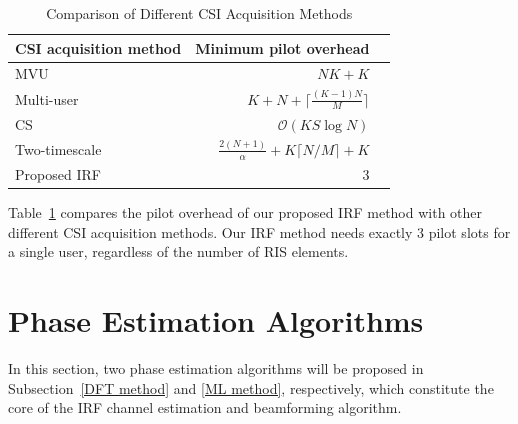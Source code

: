 \documentclass[conference,10pt,twocolumn]{IEEEtran}
\theoremstyle{nonumberplain}
\begin{document}
    \begin{table}[t]
        \caption{Comparison of Different CSI Acquisition Methods}
        \label{tab:pilot overhead comp CE}
        \centering
        \begin{tabular}{|l|r|r|}
                \hline 
                CSI acquisition method & Minimum pilot overhead\\ 
                \hline
                MVU\cite{jensen2020optimal}         & $NK+K$     \\
                \hline
                Multi-user\cite{wang2020channel}  & $K+N+ \lceil \frac{(K-1)N}{M} \rceil$\\
                \hline
                CS\cite{wei2021channel}          & $\mathcal{O}(KS\log N)$ \\
                \hline 
                Two-timescale\cite{Huchen} & $\frac{2(N+1)}{\alpha} + K\lceil N/M\rceil +K$  \\
                \hline 
                Proposed IRF & 3 \\ 
                \hline
        \end{tabular}
    \end{table}

    Table~\ref{tab:pilot overhead comp CE} compares the pilot overhead of our proposed IRF method with other different CSI acquisition methods. Our IRF method needs exactly 3 pilot slots for a single user, regardless of the number of RIS elements. 

\section{Phase Estimation Algorithms}
In this section, two phase estimation algorithms will be proposed in Subsection~\ref{DFT method} and \ref{ML method}, respectively, which constitute the core of the \ac{IRF} channel estimation and beamforming algorithm.
\end{document}
